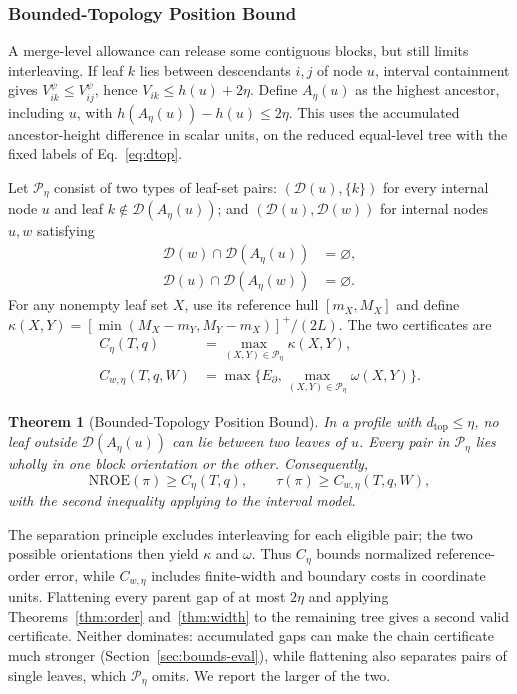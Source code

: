\documentclass[review]{vgtc}
\newtheorem{theorem}{Theorem}
\newcommand{\dtop}{d_{\mathrm{top}}}
\newcommand{\nroe}{\mathrm{NROE}}
\begin{document}
\subsubsection{Bounded-Topology Position Bound}
A merge-level allowance can release some contiguous blocks, but still limits interleaving. If leaf $k$ lies between descendants $i,j$ of node $u$, interval containment gives $V_{ik}^{\psi}\le V_{ij}^{\psi}$, hence $V_{ik}\le h(u)+2\eta$. Define $A_\eta(u)$ as the highest ancestor, including $u$, with $h(A_\eta(u))-h(u)\le2\eta$. This uses the accumulated ancestor-height difference in scalar units, on the reduced equal-level tree with the fixed labels of Eq.~\ref{eq:dtop}.

Let $\mathcal{P}_\eta$ consist of two types of leaf-set pairs: $(\mathcal{D}(u),\{k\})$ for every internal node $u$ and leaf $k\notin\mathcal{D}(A_\eta(u))$; and $(\mathcal{D}(u),\mathcal{D}(w))$ for internal nodes $u,w$ satisfying
\begin{equation}\label{eq:separatedpairs}
\begin{aligned}
 \mathcal{D}(w)\cap\mathcal{D}(A_\eta(u))&=\varnothing,\\
 \mathcal{D}(u)\cap\mathcal{D}(A_\eta(w))&=\varnothing.
\end{aligned}
\end{equation}
For any nonempty leaf set $X$, use its reference hull $[m_X,M_X]$ and define $\kappa(X,Y)=[\min(M_X-m_Y,M_Y-m_X)]^+/(2L)$. The two certificates are
\begin{equation}\label{eq:chaindef}
\begin{aligned}
 C_\eta(T,q)&=\max_{(X,Y)\in\mathcal{P}_\eta}\kappa(X,Y),\\
 C_{w,\eta}(T,q,W)&=\max\{E_\partial,\max_{(X,Y)\in\mathcal{P}_\eta}\omega(X,Y)\}.
\end{aligned}
\end{equation}
\begin{theorem}[Bounded-Topology Position Bound]\label{thm:chain}
In a profile with $\dtop\le\eta$, no leaf outside $\mathcal{D}(A_\eta(u))$ can lie between two leaves of $u$. Every pair in $\mathcal{P}_\eta$ lies wholly in one block orientation or the other. Consequently,
\begin{equation}\label{eq:chainbounds}
 \nroe(\pi)\ge C_\eta(T,q),\qquad
 \tau(\pi)\ge C_{w,\eta}(T,q,W),
\end{equation}
with the second inequality applying to the interval model.
\end{theorem}
The separation principle excludes interleaving for each eligible pair; the two possible orientations then yield $\kappa$ and $\omega$. Thus $C_\eta$ bounds normalized reference-order error, while $C_{w,\eta}$ includes finite-width and boundary costs in coordinate units. Flattening every parent gap of at most $2\eta$ and applying Theorems~\ref{thm:order} and~\ref{thm:width} to the remaining tree gives a second valid certificate. Neither dominates: accumulated gaps can make the chain certificate much stronger (Section~\ref{sec:bounds-eval}), while flattening also separates pairs of single leaves, which $\mathcal{P}_\eta$ omits. We report the larger of the two.
\end{document}
